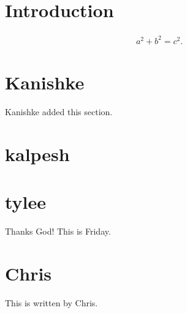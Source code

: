 \documentclass{article}
\begin{document}
\section{Introduction}

\begin{align}
    a^2 + b^2 = c^2 .
\end{align}
 
\section{Kanishke}
Kanishke added this section.

\section{kalpesh}



\section{tylee}

Thanks God! This is Friday.

\section{Chris}

This is written by Chris.
\end{document}
